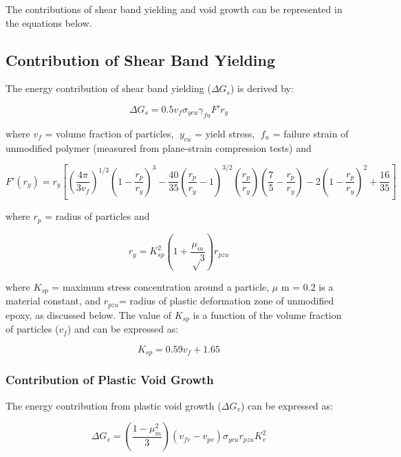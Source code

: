 \documentclass[numbers=noendperiod,chapterprefix=on]{icldt} %
\begin{document}
The contributions of shear band yielding and void growth can be represented in the equations \cite{Hsieh2010a,Hsieh2010,Giannakopoulos2011} below. 

\subsection{Contribution of Shear Band Yielding}
The energy contribution of shear band yielding ($\Delta G_s$) is derived by: 

\begin{equation} 
\Delta G_s=0.5 v_f \sigma_{ycu} \gamma_{fu} F' r_y
\end{equation}

where $v_f$ = volume fraction of particles, $y _{cu}$ = yield stress, $f_u$ = failure strain of unmodified polymer (measured from plane-strain compression tests) and

\begin{equation} 
F'(r_y)=r_y \left[\left(\frac{4\pi}{3v_f}\right)^{1/3} \left( 1-\frac{r_p}{r_y} \right)^3-
\frac{40}{35} \left( \frac{r_p}{r_y}-1\right) ^{3/2}
(\frac{r_p}{r_y})\left(\frac{7}{5}-\frac{r_p}{r_y}\right) 
-2\left(1- \frac{r_p}{r_y}\right) ^2
+\frac{16}{35}\right]
\end{equation}

where $r_p$ = radius of particles and 

\begin{equation} 
r_y= K_{sp}^2 \left( 1+\frac{\mu_m}{√3}\right)r_{pzu}
\end{equation}

where $K_{sp}$ = maximum stress concentration around a particle, $\mu$ m = 0.2 is a material constant, and $r_{pzu}$= radius of plastic deformation zone of unmodified epoxy, as discussed below. The value of $K_{sp}$ is a function of the volume fraction of particles ($v_f$) and can be expressed as:

\begin{equation} 
K_{sp}=0.59v_f+1.65
\end{equation}

\subsubsection{Contribution of Plastic Void Growth}
The energy contribution from plastic void growth ($\Delta G_v$) can be expressed as:

\begin{equation} 
\Delta G_v=\left( \frac{1-\mu_m^2}{3}\right) 
\left( v_{fv}-v_{pv}\right) 
\sigma_{ycu} r_{pzu} K_v^2
\end{equation}
\end{document}
